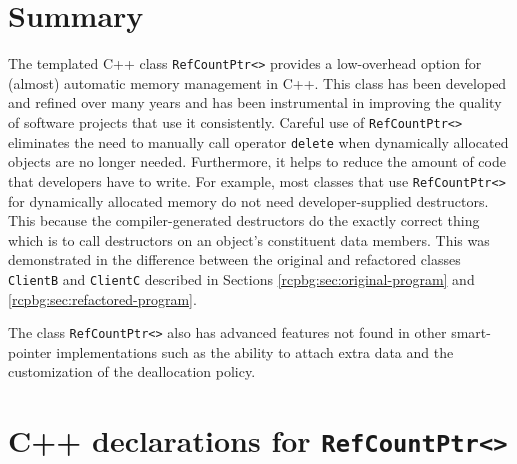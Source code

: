 \documentclass[pdf,ps2pdf,11pt]{SANDreport}
\begin{document}
%
\section{Summary}
%


The templated C++ class {}\texttt{Ref\-Count\-Ptr<>} provides a
low-overhead option for (almost) automatic memory management in C++.
This class has been developed and refined over many years and has been
instrumental in improving the quality of software projects that use it
consistently.  Careful use of {}\texttt{Ref\-Count\-Ptr<>} eliminates
the need to manually call operator {}\texttt{delete} when dynamically
allocated objects are no longer needed.  Furthermore, it helps to
reduce the amount of code that developers have to write.  For example,
most classes that use {}\texttt{Ref\-Count\-Ptr<>} for dynamically
allocated memory do not need developer-supplied destructors.  This
because the compiler-generated destructors do the exactly correct
thing which is to call destructors on an object's constituent data
members.  This was demonstrated in the difference between the original
and refactored classes {}\texttt{ClientB} and {}\texttt{ClientC}
described in Sections {}\ref{rcpbg:sec:original-program} and
{}\ref{rcpbg:sec:refactored-program}.

The class {}\texttt{Ref\-Count\-Ptr<>} also has advanced features not
found in other smart-pointer implementations such as the ability to
attach extra data and the customization of the deallocation policy.

%
\clearpage



%

\appendix

%
\section{C++ declarations for {}\texttt{Ref\-Count\-Ptr<>}}
\label{rcpqs:apdx:c++decl}
%
\end{document}
